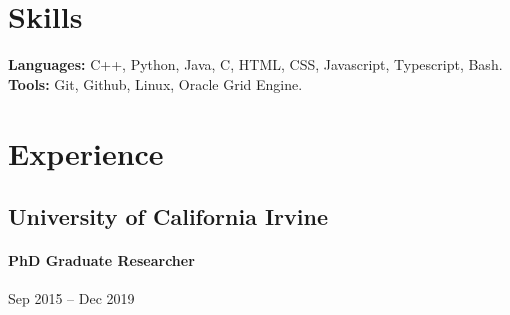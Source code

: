\documentclass[letterpaper,10pt,oneside]{article}
\begin{document}
\section*{Skills}
\textbf{Languages:} C++, Python, Java, C, HTML, CSS, Javascript, Typescript, Bash.~
\textbf{Tools:} Git, Github, Linux, Oracle Grid Engine.

\section*{Experience}
\subsection*{University of California Irvine}
\vspace{-3px}
\paragraph*{PhD Graduate Researcher} \hfill Sep 2015 -- Dec 2019
\end{document}
